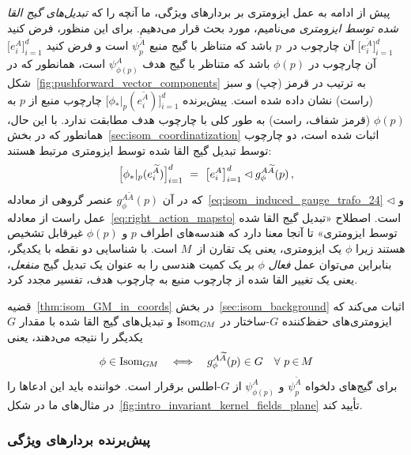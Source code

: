 پیش از ادامه به عمل ایزومتری بر بردارهای ویژگی، ما آنچه را که \emph{تبدیل‌های گیج القا شده توسط ایزومتری} می‌نامیم، مورد بحث قرار می‌دهیم.
برای این منظور، فرض کنید $\big[e_i^{\widetilde{A}} \big]_{i=1}^d$ آن چارچوب در~$p$ باشد که متناظر با گیج منبع $\psi_p^{\widetilde{A}}$ است و فرض کنید $\big[e_i^A \big]_{i=1}^d$ آن چارچوب در $\phi(p)$ باشد که متناظر با گیج هدف $\psi_{\phi(p)}^A$ است، همانطور که در شکل~\ref{fig:pushforward_vector_components} به ترتیب در قرمز (چپ) و سبز (راست) نشان داده شده است.
پیش‌برنده $\big[\phi_*|_p( e_i^{\widetilde{A}}) \big]_{i=1}^d$ چارچوب منبع از $p$ به $\phi(p)$ (قرمز شفاف، راست) به طور کلی با چارچوب هدف مطابقت ندارد.
با این حال، همانطور که در بخش~\ref{sec:isom_coordinatization} اثبات شده است، دو چارچوب توسط تبدیل گیج القا شده توسط ایزومتری مرتبط هستند:
\begin{align}
	\pig[\phi_*|_p( e_i^{\widetilde{A}}) \pig] \raisebox{-2.5pt}{$\rule{0pt}{12pt}_{i=1}^d$}
	\ =\ \big[e_i^A \big]_{i=1}^d \lhd g_\phi^{A\widetilde{A}}(p) \,,
\end{align}
که در آن $g_\phi^{A\widetilde{A}}(p)$ عنصر گروهی از معادله~\eqref{eq:isom_induced_gauge_trafo_24} و $\lhd$ عمل راست از معادله~\eqref{eq:right_action_mapsto} است.
اصطلاح «تبدیل گیج القا شده توسط ایزومتری» تا آنجا معنا دارد که هندسه‌های اطراف $p$ و $\phi(p)$ غیرقابل تشخیص هستند زیرا $\phi$ یک ایزومتری، یعنی یک تقارن از~$M$ است.
با شناسایی دو نقطه با یکدیگر، بنابراین می‌توان عمل \emph{فعال} $\phi$ بر یک کمیت هندسی را به عنوان یک تبدیل گیج \emph{منفعل}، یعنی یک تغییر القا شده از چارچوب منبع به چارچوب هدف، تفسیر مجدد کرد.


قضیه~\ref{thm:isom_GM_in_coords} در بخش~\ref{sec:isom_background} اثبات می‌کند که ایزومتری‌های حفظ‌کننده $G$-ساختار در $\operatorname{Isom}_{G\mkern-1.4muM}$ و تبدیل‌های گیج القا شده با مقدار $G$ یکدیگر را نتیجه می‌دهند، یعنی
\begin{align}\label{eq:IsomGM_coord_in_G_24}
	\phi \in \operatorname{Isom}_{G\mkern-1.4muM} \quad \Longleftrightarrow \quad g_\phi^{A\widetilde{A}}(p) \in G\ \ \ \forall\ p \mkern-1mu\in\mkern-2mu M
\end{align}
برای گیج‌های دلخواه $\psi_p^{\widetilde{A}}$ و $\psi_{\phi(p)}^A$ از $G$-اطلس برقرار است.
خواننده باید این ادعاها را در مثال‌های ما در شکل~\ref{fig:intro_invariant_kernel_fields_plane} تأیید کند.






\subsubsection{پیش‌برنده بردارهای ویژگی}

